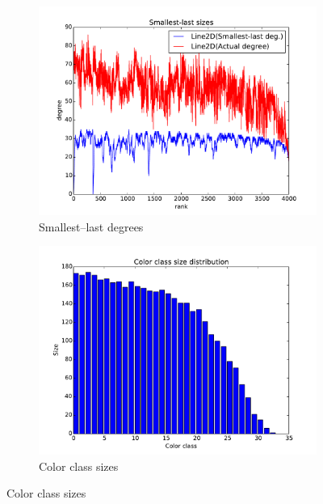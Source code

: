 \documentclass[oneside, titlepage]{scrartcl}
\begin{document}
\begin{figure}[!h]
\begin{subfigure}{0.5\textwidth}
	\centering
	\includegraphics[width=0.9\linewidth]{figures/ordering3.pdf}
	\caption{Smallest--last degrees}
\end{subfigure}%
\begin{subfigure}{0.5\textwidth}
	\centering
	\includegraphics[width=0.9\linewidth]{figures/colors3.pdf}
	\caption{Color class sizes}
\end{subfigure}


\end{figure}
\end{document}
